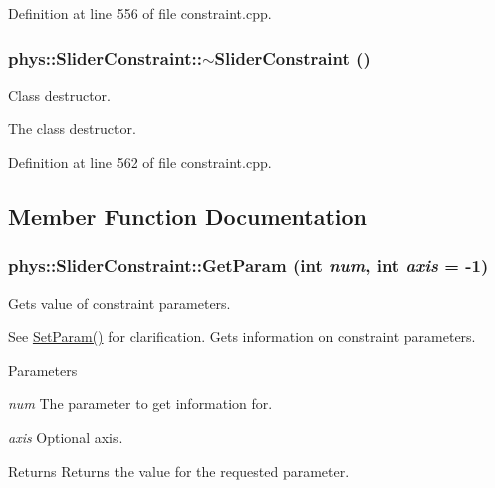 Definition at line 556 of file constraint.cpp.

\hypertarget{classphys_1_1SliderConstraint_a11f32500c6cb4ec89e7eb6160842ba35}{
\subsubsection[{$\sim$SliderConstraint}]{\setlength{\rightskip}{0pt plus 5cm}phys::SliderConstraint::$\sim$SliderConstraint ()}}
\label{dc/d72/classphys_1_1SliderConstraint_a11f32500c6cb4ec89e7eb6160842ba35}


Class destructor. 

The class destructor. 

Definition at line 562 of file constraint.cpp.



\subsection{Member Function Documentation}
\hypertarget{classphys_1_1SliderConstraint_a181393c2beec42bdebf7d1a17dfe7593}{
\subsubsection[{GetParam}]{ phys::SliderConstraint::GetParam (int {\em num}, \/  int {\em axis} = {\ttfamily -\/1})}}
\label{dc/d72/classphys_1_1SliderConstraint_a181393c2beec42bdebf7d1a17dfe7593}


Gets value of constraint parameters. 

See \hyperlink{classphys_1_1SliderConstraint_a1516aeff86674a969411b17a1847d115}{SetParam()} for clarification. Gets information on constraint parameters. 
\begin{DoxyParams}{Parameters}
\item[{\em num}]The parameter to get information for. \item[{\em axis}]Optional axis. \end{DoxyParams}
\begin{DoxyReturn}{Returns}
Returns the value for the requested parameter. 
\end{DoxyReturn}


